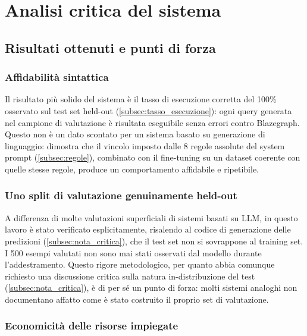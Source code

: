 \documentclass[12pt,a4paper,oneside]{book}
\begin{document}
\section{Analisi critica del sistema}\label{sec:orgoglio_modestia}


\subsection{Risultati ottenuti e punti di forza}\label{subsec:punti_forza}

\subsubsection{Affidabilità sintattica}

Il risultato più solido del sistema è il tasso di esecuzione corretta del 100\% osservato sul test set held-out (\cref{subsec:tasso_esecuzione}): ogni query generata nel campione di valutazione è risultata eseguibile senza errori contro Blazegraph. Questo non è un dato scontato per un sistema basato su generazione di linguaggio: dimostra che il vincolo imposto dalle 8 regole assolute del system prompt (\cref{subsec:regole}), combinato con il fine-tuning su un dataset coerente con quelle stesse regole, produce un comportamento affidabile e ripetibile.

\subsubsection{Uno split di valutazione genuinamente held-out}

A differenza di molte valutazioni superficiali di sistemi basati su LLM, in questo lavoro è stato verificato esplicitamente, risalendo al codice di generazione delle predizioni (\cref{subsec:nota_critica}), che il test set non si sovrappone al training set. I 500 esempi valutati non sono mai stati osservati dal modello durante l'addestramento. Questo rigore metodologico, per quanto abbia comunque richiesto una discussione critica sulla natura in-distribuzione del test (\cref{subsec:nota_critica}), è di per sé un punto di forza: molti sistemi analoghi non documentano affatto come è stato costruito il proprio set di valutazione.





\subsubsection{Economicità delle risorse impiegate}
\end{document}
